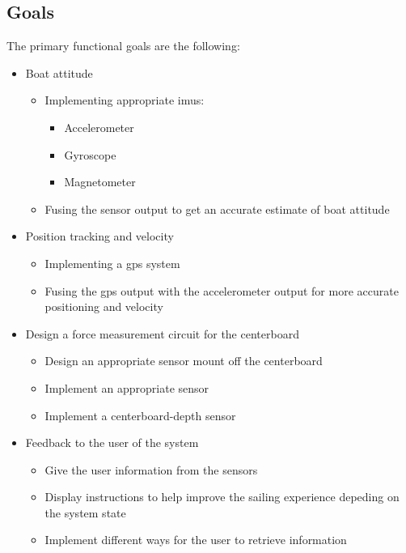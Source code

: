 \subsection{Goals}
The primary functional goals are the following:
\begin{itemize}[noitemsep] %
	\item Boat attitude
	\begin{itemize}[noitemsep]
		\item Implementing appropriate \gls{imu}s:
		\begin{itemize}[noitemsep]
			\item Accelerometer
			\item Gyroscope
			\item Magnetometer
		\end{itemize}
		\item Fusing the sensor output to get an accurate estimate of boat attitude
	\end{itemize}
	\item Position tracking and velocity
	\begin{itemize}[noitemsep]
		\item Implementing a \gls{gps} system
		\item Fusing the \gls{gps} output with the accelerometer output for more accurate positioning and velocity
	\end{itemize}
	\item Design a force measurement circuit for the centerboard
	\begin{itemize}[noitemsep]
		\item Design an appropriate sensor mount off the centerboard
		\item Implement an appropriate sensor
		\item Implement a centerboard-depth sensor
	\end{itemize}
	\item  Feedback to the user of the system
	\begin{itemize}[noitemsep]
		\item Give the user information from the sensors
		\item Display instructions to help improve the sailing experience depeding on the system state
		\item Implement different ways for the user to retrieve information
	\end{itemize}
\end{itemize}

